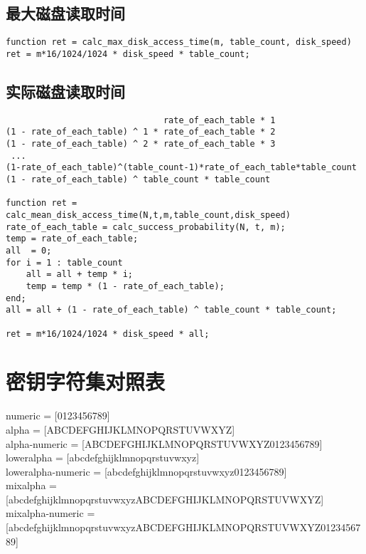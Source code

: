 \section{最大磁盘读取时间}
\begin{lstlisting}
function ret = calc_max_disk_access_time(m, table_count, disk_speed)
ret = m*16/1024/1024 * disk_speed * table_count;
\end{lstlisting}
\section{实际磁盘读取时间}
\begin{lstlisting}
                               rate_of_each_table * 1 
(1 - rate_of_each_table) ^ 1 * rate_of_each_table * 2 
(1 - rate_of_each_table) ^ 2 * rate_of_each_table * 3 
 ...
(1-rate_of_each_table)^(table_count-1)*rate_of_each_table*table_count
(1 - rate_of_each_table) ^ table_count * table_count 

function ret = calc_mean_disk_access_time(N,t,m,table_count,disk_speed)
rate_of_each_table = calc_success_probability(N, t, m);
temp = rate_of_each_table;
all  = 0;
for i = 1 : table_count
    all = all + temp * i;
    temp = temp * (1 - rate_of_each_table);
end;
all = all + (1 - rate_of_each_table) ^ table_count * table_count;

ret = m*16/1024/1024 * disk_speed * all;
\end{lstlisting}
\chapter{密钥字符集对照表}
\label{cha:a_c}
numeric            = [0123456789]\\
alpha              = [ABCDEFGHIJKLMNOPQRSTUVWXYZ]\\
alpha-numeric      = [ABCDEFGHIJKLMNOPQRSTUVWXYZ0123456789]\\
loweralpha         = [abcdefghijklmnopqrstuvwxyz]\\
loweralpha-numeric = [abcdefghijklmnopqrstuvwxyz0123456789]\\
mixalpha           = [abcdefghijklmnopqrstuvwxyzABCDEFGHIJKLMNOPQRSTUVWXYZ]\\
mixalpha-numeric   = [abcdefghijklmnopqrstuvwxyzABCDEFGHIJKLMNOPQRSTUVWXYZ0123456789]
